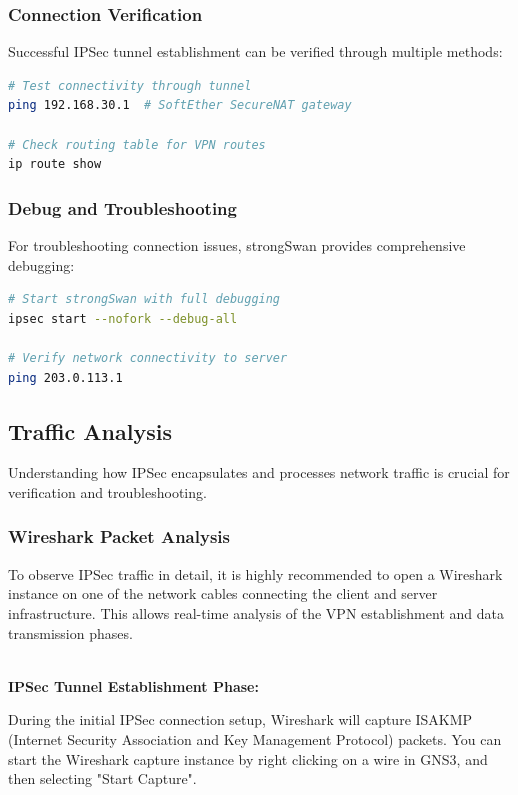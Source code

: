 \subsubsection{Connection Verification}

Successful IPSec tunnel establishment can be verified through multiple methods:

\begin{lstlisting}[language=bash]
# Test connectivity through tunnel
ping 192.168.30.1  # SoftEther SecureNAT gateway

# Check routing table for VPN routes
ip route show

\end{lstlisting}

\subsubsection{Debug and Troubleshooting}

For troubleshooting connection issues, strongSwan provides comprehensive debugging:

\begin{lstlisting}[language=bash]
# Start strongSwan with full debugging
ipsec start --nofork --debug-all

# Verify network connectivity to server
ping 203.0.113.1

\end{lstlisting}

\subsection{Traffic Analysis}

Understanding how IPSec encapsulates and processes network traffic is crucial for verification and troubleshooting.

\subsubsection{Wireshark Packet Analysis}

To observe IPSec traffic in detail, it is highly recommended to open a Wireshark instance on one of the network cables connecting the client and server infrastructure. This allows real-time analysis of the VPN establishment and data transmission phases.

\noindent
\\
\textbf{IPSec Tunnel Establishment Phase:}

\noindent
During the initial IPSec connection setup, Wireshark will capture ISAKMP (Internet Security Association and Key Management Protocol) packets. You can start the Wireshark capture instance by right clicking on a wire in GNS3, and then selecting "Start Capture".

